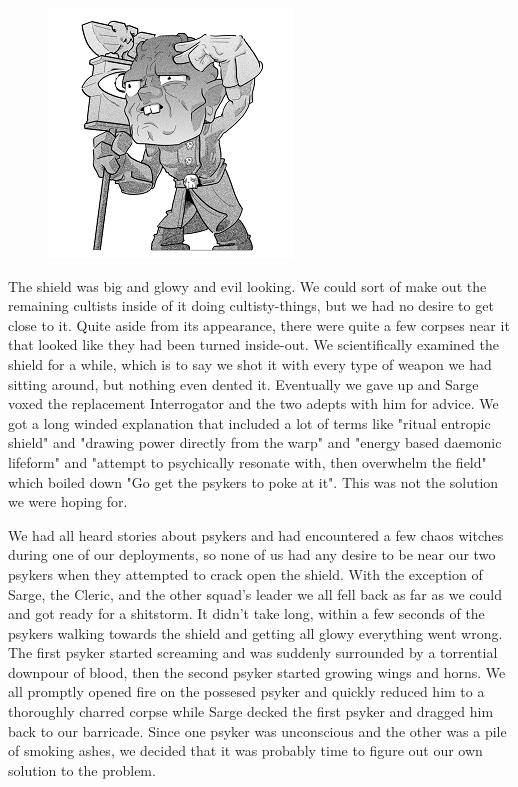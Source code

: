 \begin{figure}
	\begin{center}
		\includegraphics[width=\figwidth]{pics/2/15.png}
	\end{center}
\end{figure}
The shield was big and glowy and evil looking. 
We could sort of make out the remaining cultists inside of it doing cultisty-things, but we had no desire to get close to it. 
Quite aside from its appearance, there were quite a few corpses near it that looked like they had been turned inside-out. 
We scientifically examined the shield for a while, which is to say we shot it with every type of weapon we had sitting around, but nothing even dented it.
Eventually we gave up and Sarge voxed the replacement Interrogator and the two adepts with him for advice. 
We got a long winded explanation that included a lot of terms like "ritual entropic shield" and "drawing power directly from the warp" and "energy based daemonic lifeform" and "attempt to psychically resonate with, then overwhelm the field" which boiled down "Go get the psykers to poke at it". 
This was not the solution we were hoping for.

We had all heard stories about psykers and had encountered a few chaos witches during one of our deployments, so none of us had any desire to be near our two psykers when they attempted to crack open the shield. 
With the exception of Sarge, the Cleric, and the other squad's leader we all fell back as far as we could and got ready for a shitstorm. 
It didn't take long, within a few seconds of the psykers walking towards the shield and getting all glowy everything went wrong.
The first psyker started screaming and was suddenly surrounded by a torrential downpour of blood, then the second psyker started growing wings and horns. 
We all promptly opened fire on the possesed psyker and quickly reduced him to a thoroughly charred corpse while Sarge decked the first psyker and dragged him back to our barricade. 
Since one psyker was unconscious and the other was a pile of smoking ashes, we decided that it was probably time to figure out our own solution to the problem.

